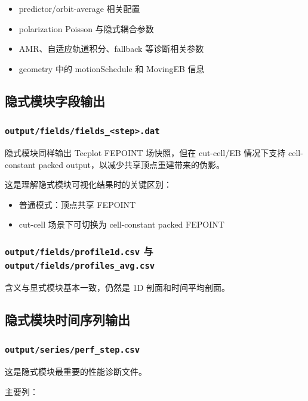 \documentclass[11pt,a4paper]{ctexart}
\newcommand{\file}[1]{\texttt{#1}}
\begin{document}
\begin{itemize}
  \item predictor/orbit-average 相关配置
  \item polarization Poisson 与隐式耦合参数
  \item AMR、自适应轨道积分、fallback 等诊断相关参数
  \item geometry 中的 motionSchedule 和 MovingEB 信息
\end{itemize}

\subsection{隐式模块字段输出}

\subsubsection{\file{output/fields/fields\_<step>.dat}}

隐式模块同样输出 Tecplot FEPOINT 场快照，但在 cut-cell/EB 情况下支持 cell-constant packed output，以减少共享顶点重建带来的伪影。

这是理解隐式模块可视化结果时的关键区别：

\begin{itemize}
  \item 普通模式：顶点共享 FEPOINT
  \item cut-cell 场景下可切换为 cell-constant packed FEPOINT
\end{itemize}

\subsubsection{\file{output/fields/profile1d.csv} 与 \file{output/fields/profiles\_avg.csv}}

含义与显式模块基本一致，仍然是 1D 剖面和时间平均剖面。

\subsection{隐式模块时间序列输出}

\subsubsection{\file{output/series/perf\_step.csv}}

这是隐式模块最重要的性能诊断文件。

主要列：
\end{document}
